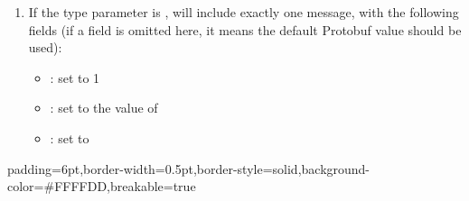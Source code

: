 \documentclass[11pt]{article}
\begin{document}
{%
\begin{enumerate}%

\item{}
If the type parameter is ,  will include exactly one
 message, with the following fields (if a field is omitted here,
it means the default Protobuf value should be used):%

\begin{itemize}[noitemsep,topsep=\mdcompacttopsep]%

\item{}: set to 1%

\item{}: set to the value of %

\item{}: set to %
\end{itemize}%
\end{enumerate}%

\begin{mdbmargintb}{6pt}{6pt}%
\begin{mdblock}{padding=6pt,border-width=0.5pt,border-style=solid,background-color=\#FFFFDD,breakable=true}%
\begin{mdpre}%
\end{mdpre}%
\end{mdblock}%
\end{mdbmargintb}%

}
\end{document}
